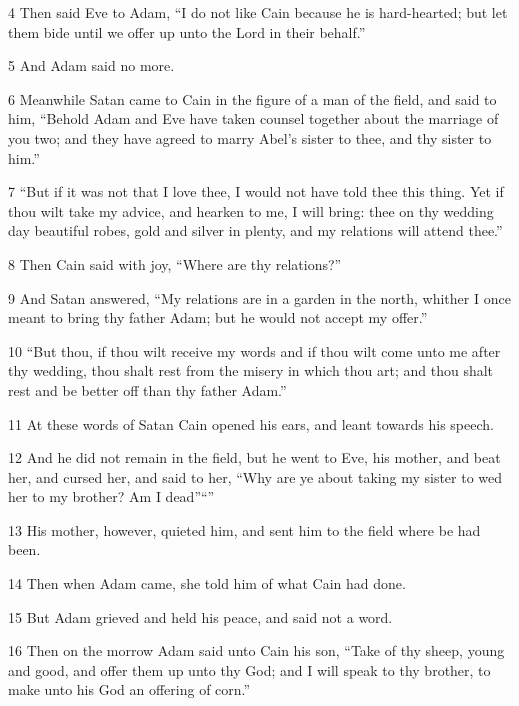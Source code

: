 \par 4 Then said Eve to Adam, “I do not like Cain because he is hard-hearted; but let them bide until we offer up unto the Lord in their behalf.”

\par 5 And Adam said no more.

\par 6 Meanwhile Satan came to Cain in the figure of a man of the field, and said to him, “Behold Adam and Eve have taken counsel together about the marriage of you two; and they have agreed to marry Abel's sister to thee, and thy sister to him.”

\par 7 “But if it was not that I love thee, I would not have told thee this thing. Yet if thou wilt take my advice, and hearken to me, I will bring: thee on thy wedding day beautiful robes, gold and silver in plenty, and my relations will attend thee.”

\par 8 Then Cain said with joy, “Where are thy relations?”

\par 9 And Satan answered, “My relations are in a garden in the north, whither I once meant to bring thy father Adam; but he would not accept my offer.”

\par 10 “But thou, if thou wilt receive my words and if thou wilt come unto me after thy wedding, thou shalt rest from the misery in which thou art; and thou shalt rest and be better off than thy father Adam.”

\par 11 At these words of Satan Cain opened his ears, and leant towards his speech.

\par 12 And he did not remain in the field, but he went to Eve, his mother, and beat her, and cursed her, and said to her, “Why are ye about taking my sister to wed her to my brother? Am I dead”“”

\par 13 His mother, however, quieted him, and sent him to the field where be had been.

\par 14 Then when Adam came, she told him of what Cain had done.

\par 15 But Adam grieved and held his peace, and said not a word.

\par 16 Then on the morrow Adam said unto Cain his son, “Take of thy sheep, young and good, and offer them up unto thy God; and I will speak to thy brother, to make unto his God an offering of corn.”

